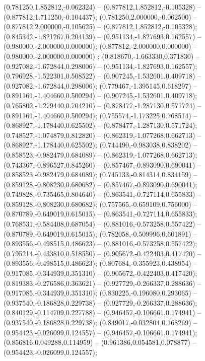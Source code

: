  (0.781250,1.852812,-0.062324) -- (0.877812,1.852812,-0.105328) -- (0.877812,1.711250,-0.104437);
 (0.781250,2.000000,-0.062500) -- (0.877812,2.000000,-0.105625) -- (0.877812,1.852812,-0.105328);
 (0.845342,-1.821267,0.204139) -- (0.951134,-1.827693,0.162557) -- (0.980000,-2.000000,0.000000);
 (0.877812,-2.000000,0.000000) -- (0.980000,-2.000000,0.000000) ;
 (0.818670,-1.663330,0.371830) -- (0.927082,-1.672844,0.298006) -- (0.951134,-1.827693,0.162557);
 (0.796928,-1.522301,0.508522) -- (0.907245,-1.532601,0.409718) -- (0.927082,-1.672844,0.298006);
 (0.779467,-1.395145,0.618297) -- (0.891161,-1.404660,0.500294) -- (0.907245,-1.532601,0.409718);
 (0.765802,-1.279440,0.704210) -- (0.878477,-1.287130,0.571724) -- (0.891161,-1.404660,0.500294);
 (0.755574,-1.173225,0.768514) -- (0.868927,-1.178440,0.625502) -- (0.878477,-1.287130,0.571724);
 (0.748527,-1.074879,0.812820) -- (0.862319,-1.077268,0.662713) -- (0.868927,-1.178440,0.625502);
 (0.744490,-0.983038,0.838202) -- (0.858523,-0.982479,0.684089) -- (0.862319,-1.077268,0.662713);
 (0.743367,-0.896527,0.845260) -- (0.857467,-0.893090,0.690041) -- (0.858523,-0.982479,0.684089);
 (0.745133,-0.814314,0.834159) -- (0.859128,-0.808230,0.680682) -- (0.857467,-0.893090,0.690041);
 (0.749828,-0.735465,0.804640) -- (0.863541,-0.727114,0.655833) -- (0.859128,-0.808230,0.680682);
 (0.757565,-0.659109,0.756000) -- (0.870789,-0.649019,0.615015) -- (0.863541,-0.727114,0.655833);
 (0.768531,-0.584408,0.687054) -- (0.881016,-0.573258,0.557422) -- (0.870789,-0.649019,0.615015);
 (0.782058,-0.509996,0.601891) -- (0.893556,-0.498515,0.486623) -- (0.881016,-0.573258,0.557422);
 (0.795214,-0.433810,0.518550) -- (0.905672,-0.422403,0.417420) -- (0.893556,-0.498515,0.486623);
 (0.807684,-0.355923,0.438954) -- (0.917085,-0.344939,0.351310) -- (0.905672,-0.422403,0.417420);
 (0.819383,-0.276586,0.363621) -- (0.927729,-0.266337,0.288636) -- (0.917085,-0.344939,0.351310);
 (0.830225,-0.196080,0.293065) -- (0.937540,-0.186828,0.229738) -- (0.927729,-0.266337,0.288636);
 (0.840129,-0.114709,0.227788) -- (0.946457,-0.106661,0.174941) -- (0.937540,-0.186828,0.229738);
 (0.849017,-0.032804,0.168269) -- (0.954423,-0.026099,0.124557) -- (0.946457,-0.106661,0.174941);
 (0.856816,0.049288,0.114959) -- (0.961386,0.054581,0.078877) -- (0.954423,-0.026099,0.124557);
